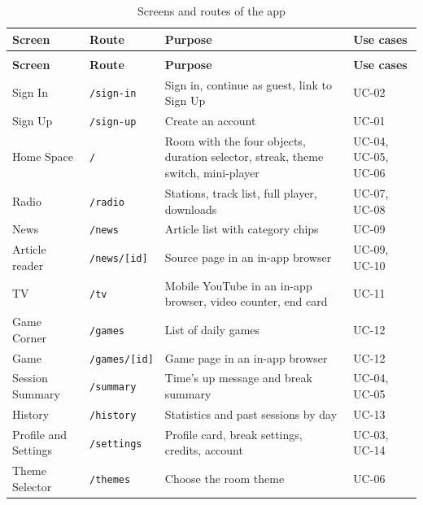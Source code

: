 \begingroup
\small
\renewcommand{\arraystretch}{1.2}
\begin{longtable}{|>{\raggedright\arraybackslash}p{3.0cm}|>{\raggedright\arraybackslash}p{2.4cm}|>{\raggedright\arraybackslash}p{6.6cm}|>{\raggedright\arraybackslash}p{1.6cm}|}
\caption{Screens and routes of the app}\label{tab:routes}\\ \hline
\textbf{Screen} & \textbf{Route} & \textbf{Purpose} & \textbf{Use cases} \\ \hline
\endfirsthead
\multicolumn{4}{c}{{\bfseries \tablename\ \thetable{} -- continued from previous page}} \\ \hline
\textbf{Screen} & \textbf{Route} & \textbf{Purpose} & \textbf{Use cases} \\ \hline
\endhead
Sign In & \texttt{/sign-in} & Sign in, continue as guest, link to Sign Up & UC-02 \\ \hline
Sign Up & \texttt{/sign-up} & Create an account & UC-01 \\ \hline
Home Space & \texttt{/} & Room with the four objects, duration selector, streak, theme switch, mini-player & UC-04, UC-05, UC-06 \\ \hline
Radio & \texttt{/radio} & Stations, track list, full player, downloads & UC-07, UC-08 \\ \hline
News & \texttt{/news} & Article list with category chips & UC-09 \\ \hline
Article reader & \texttt{/news/[id]} & Source page in an in-app browser & UC-09, UC-10 \\ \hline
TV & \texttt{/tv} & Mobile YouTube in an in-app browser, video counter, end card & UC-11 \\ \hline
Game Corner & \texttt{/games} & List of daily games & UC-12 \\ \hline
Game & \texttt{/games/[id]} & Game page in an in-app browser & UC-12 \\ \hline
Session Summary & \texttt{/summary} & Time's up message and break summary & UC-04, UC-05 \\ \hline
History & \texttt{/history} & Statistics and past sessions by day & UC-13 \\ \hline
Profile and Settings & \texttt{/settings} & Profile card, break settings, credits, account & UC-03, UC-14 \\ \hline
Theme Selector & \texttt{/themes} & Choose the room theme & UC-06 \\ \hline
\end{longtable}
\endgroup
